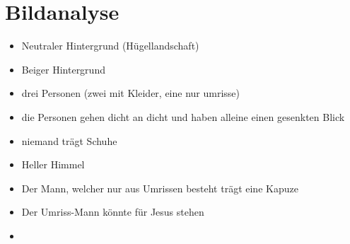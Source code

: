 \documentclass[12pt,a4paper]{report}
\begin{document}
	\section{Bildanalyse}
	\begin{itemize}
		\item Neutraler Hintergrund (Hügellandschaft)
		\item Beiger Hintergrund
		\item drei Personen (zwei mit Kleider, eine nur umrisse)
		\item die Personen gehen dicht an dicht und haben alleine einen gesenkten Blick
		\item niemand trägt Schuhe
		\item Heller Himmel
		\item Der Mann, welcher nur aus Umrissen besteht trägt eine Kapuze
		\item Der Umriss-Mann könnte für Jesus stehen
		\item  
	\end{itemize}
\end{document}

